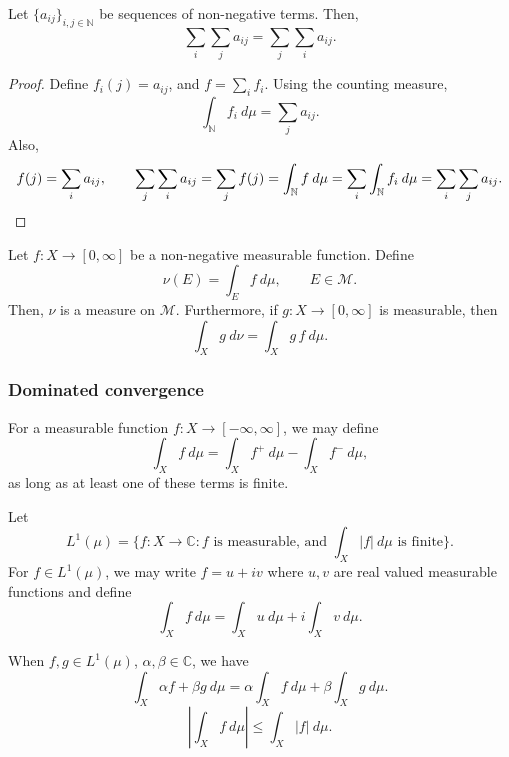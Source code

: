 \documentclass[11pt]{article}
\newcommand{\C}{\mathbb{C}}
\newcommand{\N}{\mathbb{N}}
\newcommand{\M}{\mathcal{M}}
\theoremstyle{definition}
\theoremstyle{remark}
\numberwithin{equation}{section}
\begin{document}
    \begin{lemma}
        Let $\{a_{ij}\}_{i,j \in \N}$ be sequences of non-negative terms. Then, \[
            \sum_i\sum_j a_{ij} = \sum_j\sum_i a_{ij}.
        \] 
    \end{lemma}
    \begin{proof}
        Define $f_i(j) = a_{ij}$, and $f = \sum_i f_i$. Using the counting measure, \[
            \int_\N f_i\:d\mu = \sum_j a_{ij}.
        \] Also, \[
            f(j) = \sum_i a_{ij}, \qquad
            \sum_j\sum_i a_{ij} = \sum_j f(j) = 
            \int_\N f\:d\mu = \sum_i\int_\N f_i\:d\mu = \sum_i\sum_j a_{ij}. \qedhere
        \] 
    \end{proof}


    \begin{theorem}
        Let $f\colon X \to [0, \infty]$ be a non-negative measurable function. Define
        \[
            \nu(E) = \int_E f\:d\mu, \qquad E \in \M.
        \] Then, $\nu$ is a measure on $\M$. Furthermore, if $g\colon X \to [0,
        \infty]$ is measurable, then \[
            \int_X g\:d\nu = \int_X g\,f\:d\mu.
        \] 
    \end{theorem}

    
    \subsubsection{Dominated convergence}

    \begin{definition}
        For a measurable function $f\colon X \to [-\infty, \infty]$, we may define \[
            \int_X f\:d\mu = \int_X f^+\:d\mu - \int_X f^-\:d\mu,
        \] as long as at least one of these terms is finite.
    \end{definition}

    \begin{definition}
        Let \[
            L^1(\mu) = \{f\colon X \to \C : f\text{ is measurable, and }\int_X
            |f|\:d\mu \text{ is finite}\}.
        \] For $f \in L^1(\mu)$, we may write $f = u + iv$ where $u, v$ are real
        valued measurable functions and define \[
            \int_X f\:d\mu = \int_X u\:d\mu + i\int_X v\:d\mu.
        \]
    \end{definition}

    \begin{lemma}
        When $f, g \in L^1(\mu)$, $\alpha, \beta \in \C$, we have \[
            \int_X \alpha f + \beta g \:d\mu = \alpha\int_X f\:d\mu + \beta\int_X
            g\:d\mu.
        \] \[
            \left|\int_X f \:d\mu \right| \leq \int_X |f| \:d\mu.
        \] 
    \end{lemma}
    
\end{document}

